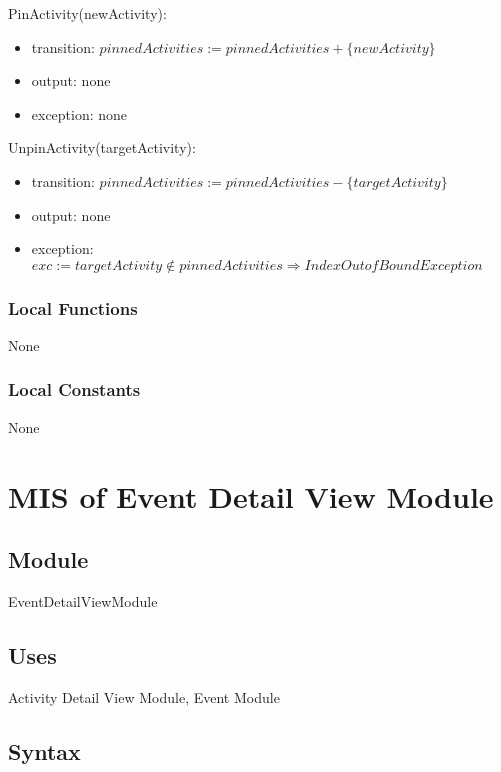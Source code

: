 \documentclass[12pt, titlepage]{article}
\begin{document}
\noindent PinActivity(newActivity):
\begin{itemize}
\item transition: $pinnedActivities := pinnedActivities + \{newActivity\}$
\item output: none
\item exception: none
\end{itemize}

\noindent UnpinActivity(targetActivity):
\begin{itemize}
\item transition: $pinnedActivities := pinnedActivities - \{targetActivity\}$
\item output: none
\item exception: $exc := targetActivity \notin pinnedActivities \Rightarrow IndexOutofBound Exception$
\end{itemize}

\subsubsection{Local Functions}

None

\subsubsection{Local Constants}

None

\newpage

\section{MIS of Event Detail View Module} \label{mEDV}

\subsection{Module}

EventDetailViewModule

\subsection{Uses}

Activity Detail View Module, Event Module

\subsection{Syntax}
\end{document}
